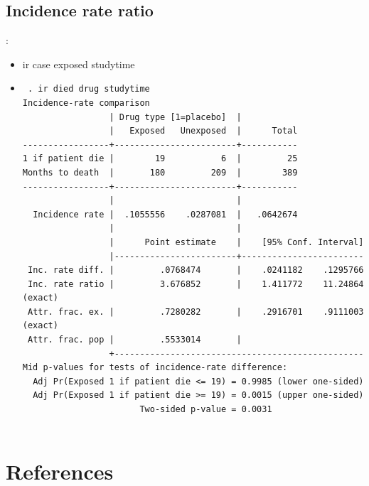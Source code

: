 \subsection{Incidence rate ratio}
\begin{frame}[fragile]{\secname: \subsecname}	
\begin{itemize}
\item ir case exposed studytime
\item[] \scriptsize \begin{verbatim}
 . ir died drug studytime
Incidence-rate comparison
                 | Drug type [1=placebo]  |
                 |   Exposed   Unexposed  |      Total
-----------------+------------------------+-----------
1 if patient die |        19           6  |         25
Months to death  |       180         209  |        389
-----------------+------------------------+-----------
                 |                        |
  Incidence rate |  .1055556    .0287081  |   .0642674
                 |                        |
                 |      Point estimate    |    [95% Conf. Interval]
                 |------------------------+------------------------
 Inc. rate diff. |         .0768474       |    .0241182    .1295766 
 Inc. rate ratio |         3.676852       |    1.411772    11.24864 (exact)
 Attr. frac. ex. |         .7280282       |    .2916701    .9111003 (exact)
 Attr. frac. pop |         .5533014       |
                 +-------------------------------------------------
Mid p-values for tests of incidence-rate difference:
  Adj Pr(Exposed 1 if patient die <= 19) = 0.9985 (lower one-sided)
  Adj Pr(Exposed 1 if patient die >= 19) = 0.0015 (upper one-sided)
                       Two-sided p-value = 0.0031
	
 \end{verbatim}
 \end{itemize}
\end{frame}

\section{References}
\begin{frame}{\secname}
    \begin{scriptsize}
	
	
    \end{scriptsize}
\end{frame}



